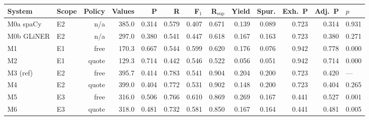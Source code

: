 \begin{tabular}{llrrrrrrrrrr}
\toprule
System & Scope & Policy & Values & P & R & F$_1$ & R$_{\mathrm{sup}}$ & Yield & Spur. & Exh.\ P & Adj.\ P & $p$ \\
\midrule
M0a spaCy & E2 & n/a & 385.0 & 0.314 & 0.579 & 0.407 & 0.671 & 0.139 & 0.089 & 0.723 & 0.314 & 0.931 \\
M0b GLiNER & E2 & n/a & 297.0 & 0.380 & 0.541 & 0.447 & 0.618 & 0.167 & 0.163 & 0.723 & 0.380 & 0.271 \\
M1 & E1 & free & 170.3 & 0.667 & 0.544 & 0.599 & 0.620 & 0.176 & 0.076 & 0.942 & 0.778 & 0.000 \\
M2 & E1 & quote & 129.3 & 0.714 & 0.442 & 0.546 & 0.522 & 0.056 & 0.051 & 0.942 & 0.714 & 0.000 \\
M3 (ref) & E2 & free & 395.7 & 0.414 & 0.783 & 0.541 & 0.904 & 0.204 & 0.200 & 0.723 & 0.420 & --- \\
M4 & E2 & quote & 399.0 & 0.404 & 0.772 & 0.531 & 0.902 & 0.148 & 0.200 & 0.723 & 0.404 & 0.265 \\
M5 & E3 & free & 316.0 & 0.506 & 0.766 & 0.610 & 0.869 & 0.269 & 0.167 & 0.441 & 0.527 & 0.001 \\
M6 & E3 & quote & 318.0 & 0.481 & 0.732 & 0.581 & 0.850 & 0.167 & 0.164 & 0.441 & 0.481 & 0.005 \\
\bottomrule
\end{tabular}
